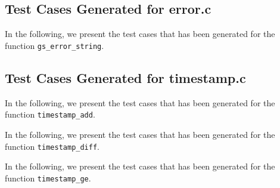 \newpage
\subsection{Test Cases Generated for error.c}

In the following, we present the test cases that has been generated for the function \texttt{gs\_error\_string}.







\newpage
\subsection{Test Cases Generated for timestamp.c}

In the following, we present the test cases that has been generated for the function \texttt{timestamp\_add}.




In the following, we present the test cases that has been generated for the function \texttt{timestamp\_diff}.





In the following, we present the test cases that has been generated for the function \texttt{timestamp\_ge}.


